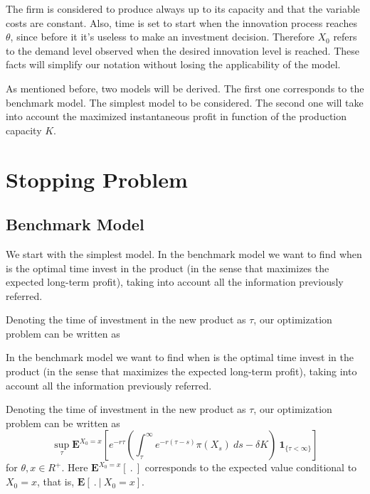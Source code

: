 The firm is considered to produce always up to its capacity and that the variable costs are constant. Also, time is set to start when the innovation process reaches $\theta$, since before it it's useless to make an investment decision. Therefore $X_0$ refers to the demand level observed when the desired innovation level is reached. These facts will simplify our notation without losing the applicability of the model.

As mentioned before, two models will be derived. The first one corresponds to the benchmark model. The simplest model to be considered. The second one will take into account the maximized instantaneous profit in function of the production capacity $K$.


\section{Stopping Problem}
\label{section:1_theory}



\subsection{Benchmark Model}
\label{subsec:1_bm}

We start with the simplest model. In the benchmark model we want to find when is the optimal time invest in the product (in the sense that maximizes the expected long-term profit), taking into account all the information previously referred.

Denoting the time of investment in the new product as $\tau$, our optimization problem can be written as 

In the benchmark model we want to find when is the optimal time invest in the product (in the sense that maximizes the expected long-term profit), taking into account all the information previously referred.

Denoting the time of investment in the new product as $\tau$, our optimization problem can be written as 
\begin{equation}
\sup_\tau \textbf{E}^{X_0=x} \left[e^{-r\tau }\left( \int_\tau^\infty e^{-r(\tau-s)} \pi(X_s)\ ds -\delta K \right) \ \textbf{1}_{\{\tau<\infty\}} \right]
\label{eq:probjj}
\end{equation}
for $\theta, x\in R^+$. Here $\textbf{E}^{X_0=x}\left[ \ . \ \right]$ corresponds to the expected value conditional to $X_0=x$, that is, $\textbf{E} \left[ \ . \ | \ X_0=x \right]$.

